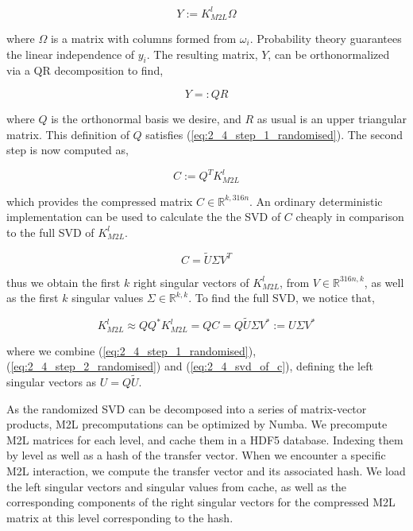 \documentclass{IEEEcsmag}
\begin{document}
\begin{equation}
    Y := K_{M2L}^l \Omega
\end{equation}

where $\Omega$ is a matrix with columns formed from $\omega_i$. Probability theory guarantees the linear independence of $y_i$. The resulting matrix, $Y$, can be orthonormalized via a QR decomposition to find,

\begin{equation}
    Y =: QR
\end{equation}

where $Q$ is the orthonormal basis we desire, and $R$ as usual is an upper triangular matrix. This definition of $Q$ satisfies (\ref{eq:2_4_step_1_randomised}). The second step is now computed as,

\begin{equation}
    C := Q^T K_{M2L}^l
    \label{eq:2_4_step_2_randomised}
\end{equation}

which provides the compressed matrix $C \in \mathbb{R}^{k, 316n}$.
An ordinary deterministic implementation can be used to calculate the the SVD of $C$ cheaply in comparison to the full SVD of $K_{M2L}^l$.

\begin{equation}
    C = \tilde{U}\Sigma V^T
    \label{eq:2_4_svd_of_c}
\end{equation}

thus we obtain the first $k$ right singular vectors of $K_{M2L}^l$, from $V \in \mathbb{R}^{316n, k}$, as well as the first $k$ singular values $\Sigma \in \mathbb{R}^{k, k}$. To find the full SVD, we notice that,

\begin{equation}
    K_{M2L}^l \approx Q Q^* K_{M2L}^l = QC = Q \tilde{U} \Sigma V^* := U\Sigma V^*
\end{equation}

where we combine (\ref{eq:2_4_step_1_randomised}), (\ref{eq:2_4_step_2_randomised}) and (\ref{eq:2_4_svd_of_c}), defining the left singular vectors as $U = Q \tilde{U}$.

As the randomized SVD can be decomposed into a series of matrix-vector products, M2L precomputations can be optimized by Numba. We precompute M2L matrices for each level, and cache them in a HDF5 database. Indexing them by level as well as a hash of the transfer vector. When we encounter a specific M2L interaction, we compute the transfer vector and its associated hash. We load the left singular vectors and singular values from cache, as well as the corresponding components of the right singular vectors for the compressed M2L matrix at this level corresponding to the hash.
\end{document}
